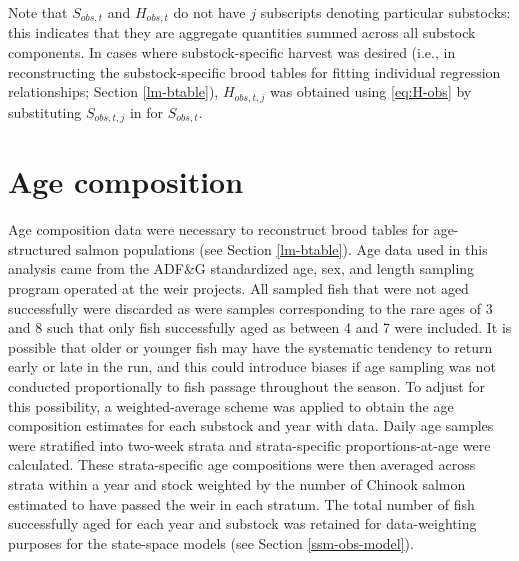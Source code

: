 \documentclass[12pt,]{book}
\theoremstyle{definition}
\theoremstyle{definition}
\theoremstyle{definition}
\theoremstyle{remark}
\begin{document}
Note that \(S_{obs,t}\) and \(H_{obs,t}\) do not have \(j\) subscripts
denoting particular substocks: this indicates that they are aggregate
quantities summed across all substock components. In cases where
substock-specific harvest was desired (i.e., in reconstructing the
substock-specific brood tables for fitting individual regression
relationships; Section \ref{lm-btable}), \(H_{obs,t,j}\) was obtained
using \eqref{eq:H-obs} by substituting \(S_{obs,t,j}\) in for
\(S_{obs,t}\).

\section{Age composition}\label{age-comp}

\noindent
Age composition data were necessary to reconstruct brood tables for
age-structured salmon populations (see Section \ref{lm-btable}). Age
data used in this analysis came from the ADF\&G standardized age, sex,
and length sampling program operated at the weir projects. All sampled
fish that were not aged successfully were discarded as were samples
corresponding to the rare ages of 3 and 8 such that only fish
successfully aged as between 4 and 7 were included. It is possible that
older or younger fish may have the systematic tendency to return early
or late in the run, and this could introduce biases if age sampling was
not conducted proportionally to fish passage throughout the season. To
adjust for this possibility, a weighted-average scheme was applied to
obtain the age composition estimates for each substock and year with
data. Daily age samples were stratified into two-week strata and
strata-specific proportions-at-age were calculated. These
strata-specific age compositions were then averaged across strata within
a year and stock weighted by the number of Chinook salmon estimated to
have passed the weir in each stratum. The total number of fish
successfully aged for each year and substock was retained for
data-weighting purposes for the state-space models (see Section
\ref{ssm-obs-model}).

\clearpage

\singlespacing
\end{document}
